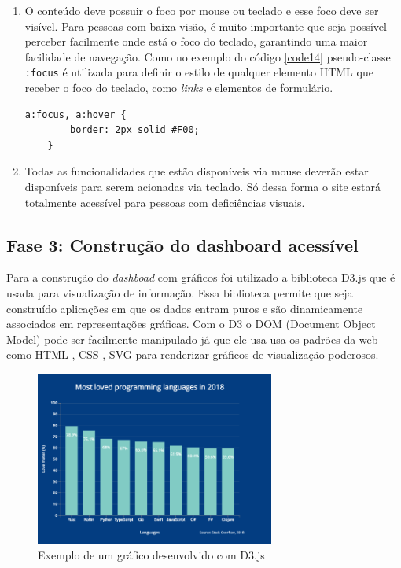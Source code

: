 {\begin{enumerate}
    \item O conteúdo deve possuir o foco por mouse ou teclado e esse foco deve ser visível. Para pessoas com baixa visão, é muito importante que seja possível perceber facilmente onde está o foco do teclado, garantindo uma maior facilidade de navegação. Como no exemplo do código \ref{code14} pseudo-classe \lstinline{:focus} é utilizada para definir o estilo de qualquer elemento HTML \cite{HTML} que receber o foco do teclado, como \textit{links} e elementos de formulário.
    {\begin{lstlisting}[language=html,caption={Exemplo de como estilizar o o elemento nos estados de foco e hover.}, label=code14]
    a:focus, a:hover {
        border: 2px solid #F00;
    }
    \end{lstlisting}}
    \item Todas as funcionalidades que estão disponíveis via mouse deverão estar disponíveis para serem acionadas via teclado. Só dessa forma o site estará totalmente acessível para pessoas com deficiências visuais.
\end{enumerate}
}




\subsection{Fase 3: Construção do dashboard acessível}
{Para a construção do \textit{dashboad} com gráficos foi utilizado a biblioteca D3.js \cite{D3} que é usada para visualização de informação. Essa biblioteca permite que seja construído aplicações em que os dados entram puros e são dinamicamente associados em representações gráficas. Com o D3 o DOM \cite{DOM} (Document Object Model)  pode ser facilmente manipulado já que ele usa usa os padrões da web como HTML \cite{HTML}, CSS \cite{CSS}, SVG para renderizar gráficos de visualização poderosos.

\begin{figure}[ht]
  	\center
    \includegraphics[width=0.7\textwidth]{images/exemplo-graf-d3.png}
    \caption{Exemplo de um gráfico desenvolvido com D3.js}
\end{figure} 

}

